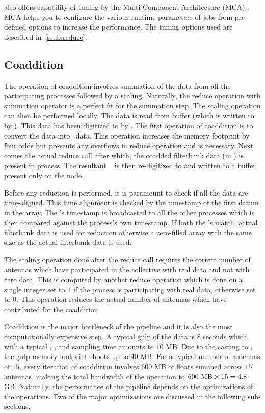 \par \mpi also offers capability of tuning by the Multi Component Architecture (MCA). MCA helps you to configure the various runtime parameters of \mpi jobs from pre-defined options to increase the performance. The tuning options used are described in~\autoref{ssub:reduce}.

\subsection {Coaddition}
\label{ssub:coadd}

\par The operation of coaddition involves summation of the data from all the participating processes followed by a scaling. Naturally, the reduce operation with summation operator is a perfect fit for the summation step. 
The scaling operation can then be performed locally. 
The data is read from \dada buffer (which is written to by \pb). This data has been digitized to \nbit{} by \pb. 
The first operation of coaddition is to convert the \nbit{} data into \float~data. 
This operation increases the memory footprint by four folds but prevents any overflows in reduce operation and is necessary. 
Next comes the actual \mpi reduce call after which, the coadded filterbank data (in \float) is present in \root process.
The resultant \float~ is then re-digitized to \nbit{} and written to a \dada buffer present only on the \root node.

\par Before any reduction is performed, it is paramount to check if all the data are time-aligned. 
This time alignment is checked by the \mjd timestamp of the first datum in the array. 
The \root's timestamp is broadcasted to all the other processes which is then compared against the process's own \mjd timestamp. 
If both the \mjd's match, actual filterbank data is used for reduction otherwise a zero-filled array with the same size as the actual filterbank data is used.

\par The scaling operation done after the \mpi reduce call requires the correct number of antennas which have participated in the collective with real data and not with zero data. 
This is computed by another \mpi reduce operation which is done on a single integer set to $1$ if the process is participating with real data, otherwise set to $0$. This operation reduces the actual number of antennas which have contributed for the coaddition.

\par Coaddition is the major bottleneck of the pipeline and it is also the most computationally expensive step. 
A typical gulp of the data is $8$ seconds which with a typical , , and sampling time amounts to $10$ MB.
Due to the casting to \float, the gulp memory footprint shoots up to $40$ MB.
For a typical number of antennas of $15$, every iteration of coaddition involves $600$ MB of floats summed across $15$ antennas, 
making the total bandwidth of the operation to $600\ {\rm MB} \times 15 = 4.8$ GB.
Naturally, the performance of the pipeline depends on the optimizations of the \mpi operations.
Two of the major optimizations are discussed in the following sub-sections.

